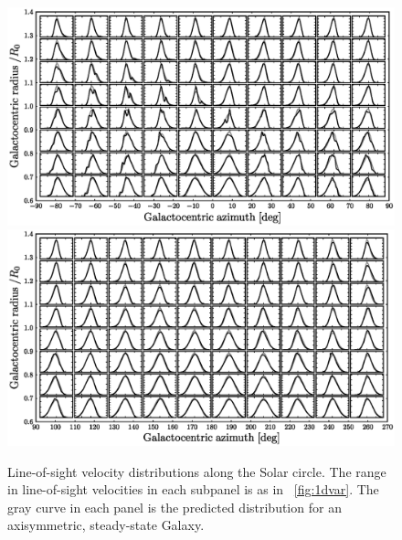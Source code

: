 \documentclass[12pt,preprint]{aastex}
\begin{document}
\clearpage
\begin{figure}
\includegraphics[width=\textwidth]{rphi1d.ps}\\
\includegraphics[width=\textwidth]{rphi1d2.ps}
\caption{Line-of-sight velocity distributions along the Solar
  circle. The range in line-of-sight velocities in each subpanel is as
  in \figurename~\ref{fig:1dvar}. The gray curve in each panel is the
  predicted distribution for an axisymmetric, steady-state
  Galaxy.}\label{fig:rphi1d}
\end{figure}
\end{document}
